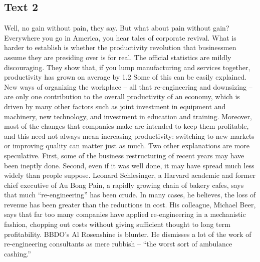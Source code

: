 \subsection{Text 2}
Well, no gain without pain, they say. But what about pain without gain? Everywhere you go in America, you hear tales of corporate revival. What is harder to establish is whether the productivity revolution that businessmen assume they are presiding over is for real.
The official statistics are mildly discouraging. They show that, if you lump manufacturing and services together, productivity has grown on average by 1.2%
Some of this can be easily explained. New ways of organizing the workplace -- all that re-engineering and downsizing -- are only one contribution to the overall productivity of an economy, which is driven by many other factors such as joint investment in equipment and machinery, new technology, and investment in education and training. Moreover, most of the changes that companies make are intended to keep them profitable, and this need not always mean increasing productivity: switching to new markets or improving quality can matter just as much.
Two other explanations are more speculative. First, some of the business restructuring of recent years may have been ineptly done. Second, even if it was well done, it may have spread much less widely than people suppose.
Leonard Schlesinger, a Harvard academic and former chief executive of Au Bong Pain, a rapidly growing chain of bakery cafes, says that much “re-engineering” has been crude. In many cases, he believes, the loss of revenue has been greater than the reductions in cost. His colleague, Michael Beer, says that far too many companies have applied re-engineering in a mechanistic fashion, chopping out costs without giving sufficient thought to long term profitability. BBDO’s Al Rosenshine is blunter. He dismisses a lot of the work of re-engineering consultants as mere rubbish -- “the worst sort of ambulance cashing.”
